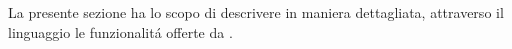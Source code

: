 \documentclass[../analisi-dei-requisiti]{subfiles}
\begin{document}
La presente sezione ha lo scopo di descrivere in maniera dettagliata, attraverso il linguaggio  le funzionalitá offerte da .
\end{document}
